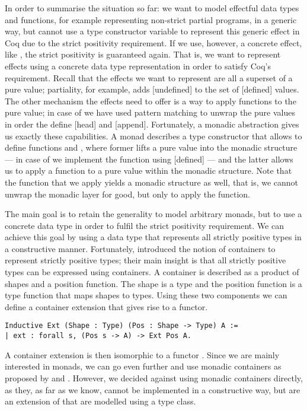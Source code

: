 In order to summarise the situation so far: we want to model effectful
data types and functions, for example representing non-strict partial
programs, in a generic way, but cannot use a type constructor variable
to represent this generic effect in Coq due to the strict positivity
requirement.
If we use, however, a concrete effect, like , the strict
positivity is guaranteed again.
That is, we want to represent effects using a concrete data type
representation in order to satisfy Coq's requirement.
Recall that the effects we want to represent are all a superset of a
pure value; partiality, for example, adds [undefined] to the set of
[defined] values.
The other mechanism the effects need to offer is a way to apply
functions to the pure value; in case of  we have used pattern
matching to unwrap the pure values in order the define [head] and
[append].
Fortunately, a monadic abstraction gives us exactly these
capabilities.
A monad describes a type constructor  that allows to define
functions  and , where former lifts a pure value into the monadic structure
--- in case of  we implement the function using [defined] ---
and the latter allows us to apply a function to a pure value within
the monadic structure.
Note that the function that we apply yields a monadic structure as
well, that is, we cannot unwrap the monadic layer for good, but only
to apply the function.

The main goal is to retain the generality to model arbitrary monads,
but to use a concrete data type in order to fulfil the strict
positivity requirement.
We can achieve this goal by using a data type that represents all
strictly positive types in a constructive manner.
Fortunately, \cite{abbott2003categories} introduced the notion of
containers to represent strictly positive types; their main insight is
that all strictly positive types can be expressed using containers.
A container is described as a product of shapes and a position function.
The shape is a type  and the position function  is a type
function that maps shapes to types.
Using these two components we can define a container extension that
gives rise to a functor.

\begin{verbatim}
Inductive Ext (Shape : Type) (Pos : Shape -> Type) A :=
| ext : forall s, (Pos s -> A) -> Ext Pos A.
\end{verbatim}

A container extension  is then isomorphic to a functor
.
Since we are mainly interested in monads, we can go even further and
use monadic containers as proposed by \citet{altenkirch2017monadic} and
\citet{uustalu2017partiality}.
However, we decided against using monadic containers directly, as
they, as far as we know, cannot be implemented in a constructive way,
but are an extension of  that are modelled using a type
class.

